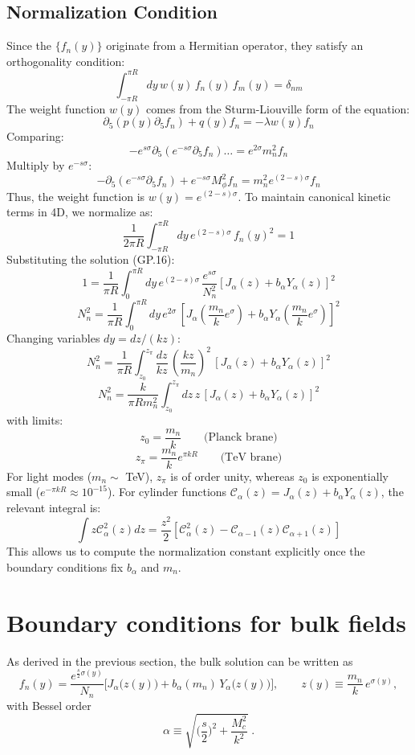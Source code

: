 \documentclass[11pt]{article}
\begin{document}
\subsection{Normalization Condition}
Since the $\{f_n(y)\}$ originate from a Hermitian operator, they satisfy an orthogonality condition:
\[
\int_{-\pi R}^{\pi R} dy \, w(y) \, f_n(y) \, f_m(y) = \delta_{nm}
\]
The weight function $w(y)$ comes from the Sturm-Liouville form of the equation:
\[
\partial_5 (p(y) \partial_5 f_n) + q(y) f_n = -\lambda w(y) f_n
\]
Comparing:
\[
-e^{s\sigma} \partial_5 (e^{-s\sigma} \partial_5 f_n) \dots = e^{2\sigma} m_n^2 f_n
\]
Multiply by $e^{-s\sigma}$:
\[
-\partial_5 (e^{-s\sigma} \partial_5 f_n) + e^{-s\sigma} M_\phi^2 f_n = m_n^2 e^{(2-s)\sigma} f_n
\]
Thus, the weight function is $w(y) = e^{(2-s)\sigma}$.
To maintain canonical kinetic terms in 4D, we normalize as:
\[
\frac{1}{2\pi R} \int_{-\pi R}^{\pi R} dy \, e^{(2-s)\sigma} \, f_n(y)^2 = 1
\]
Substituting the solution (GP.16):
\[
1 = \frac{1}{\pi R} \int_{0}^{\pi R} dy \, e^{(2-s)\sigma} \, \frac{e^{s\sigma}}{N_n^2} \left[ J_\alpha(z) + b_\alpha Y_\alpha(z) \right]^2
\]
\[
N_n^2 = \frac{1}{\pi R} \int_{0}^{\pi R} dy \, e^{2\sigma} \, \left[ J_\alpha \left( \frac{m_n}{k}e^\sigma \right) + b_\alpha Y_\alpha \left( \frac{m_n}{k}e^\sigma \right) \right]^2
\]
Changing variables $dy = dz / (kz)$:
\[
N_n^2 = \frac{1}{\pi R} \int_{z_0}^{z_\pi} \frac{dz}{kz} \, \left( \frac{kz}{m_n} \right)^2 \, \left[ J_\alpha(z) + b_\alpha Y_\alpha(z) \right]^2
\]
\[
N_n^2 = \frac{k}{\pi R m_n^2} \int_{z_0}^{z_\pi} dz \, z \, \left[ J_\alpha(z) + b_\alpha Y_\alpha(z) \right]^2
\]
with limits:
\[
z_0 = \frac{m_n}{k} \qquad \text{(Planck brane)}
\]
\[
z_\pi = \frac{m_n}{k} e^{\pi k R} \qquad \text{(TeV brane)}
\]
For light modes ($m_n \sim$ TeV), $z_\pi$ is of order unity, whereas $z_0$ is exponentially small ($e^{-\pi k R} \approx 10^{-15}$). For cylinder functions $\mathcal{C}_\alpha(z) = J_\alpha(z) + b_\alpha Y_\alpha(z)$, the relevant integral is:
\[
\int z \mathcal{C}_\alpha^2(z) dz = \frac{z^2}{2} \left[ \mathcal{C}_\alpha^2(z) - \mathcal{C}_{\alpha-1}(z) \mathcal{C}_{\alpha+1}(z) \right]
\]
This allows us to compute the normalization constant explicitly once the boundary conditions fix $b_\alpha$ and $m_n$.

\section{Boundary conditions for bulk fields}

As derived in the previous section, the bulk solution can be written as
\begin{equation}
f_n(y)=\frac{e^{\frac{s}{2}\sigma(y)}}{N_n}\Big[
J_\alpha\!\Big(z(y)\Big)+b_\alpha(m_n)\,Y_\alpha\!\Big(z(y)\Big)\Big],
\qquad
z(y)\equiv \frac{m_n}{k}\,e^{\sigma(y)} ,
\label{eq:fn-general}
\end{equation}
with Bessel order
\begin{equation}
\alpha \equiv \sqrt{\Big(\frac{s}{2}\Big)^2+\frac{M_c^2}{k^2}}\;.
\label{eq:alpha-def}
\end{equation}
\end{document}
